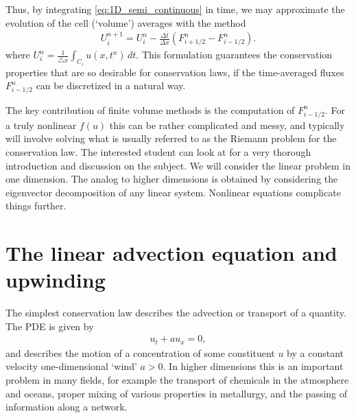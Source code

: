 Thus, by integrating \eqref{eq:1D_semi_continuous} in time, we may approximate the evolution of the cell (`volume') averages with the method
\begin{align}\label{eq:flux_form}
U_i^{n+1} = U_i^n - \frac{\Delta t}{\Delta x} \left(F^n_{i+1/2}-F^n_{i-1/2}\right).
\end{align}
where $U_i^n = \frac{1}{\triangle x} \int_{C_i} u(x,t^n) \, dt$.
This formulation guarantees the conservation properties that are so desirable for conservation laws, if the time-averaged fluxes $F_{i-1/2}^n$ can be discretized in a natural way.

% 

The key contribution of finite volume methods is the computation of $F_{i-1/2}^n$.  For a truly nonlinear $f(u)$ this can be rather complicated and messy, and typically will involve solving what is usually referred to as the Riemann problem for the conservation law.  
The interested student can look at \cite{Le2002} for a very thorough introduction and discussion on the subject.  
We will consider the linear problem in one dimension.  The analog to higher dimensions is obtained by considering the eigenvector decomposition of any linear system.  Nonlinear equations complicate things further. 

\section*{The linear advection equation and upwinding}
The simplest conservation law describes the advection or transport of a quantity. The PDE is given by 
\begin{align}
u_t + au_x = 0, \label{fv:advection}
\end{align}
and describes the motion of a concentration of some constituent $u$ by a constant velocity one-dimensional `wind' $a>0$. 
In higher dimensions this is an important problem in many fields, for example the transport of chemicals in the atmosphere and oceans, proper mixing of various properties in metallurgy, and the passing of information along a network.

